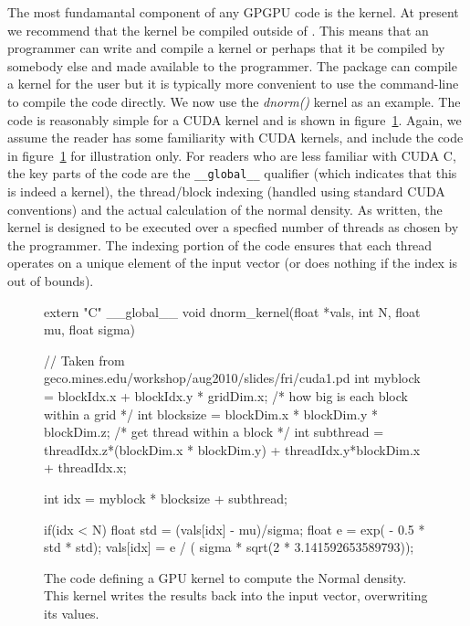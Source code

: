 \documentclass[article]{jss}
\def\C{\proglang{C}}
\def\R{\proglang{R}}
\def\Rpkg#1{\pkg{#1}}
\def\Cfunc#1{\textit{#1()}}
\begin{document}
The most fundamantal component of any GPGPU code is the kernel. 
At present we recommend that the kernel be compiled outside of \R.  This
means that an \R{} programmer can write and compile a kernel or
perhaps that it be compiled by somebody else and made available to the
\R{} programmer.  The \Rpkg{RCUDA} package can compile a kernel for
the \R{} user but it is typically more convenient to use the command-line
to compile the code directly. We now use the \Cfunc{dnorm} kernel as an example.
The code is reasonably simple for a CUDA kernel and is shown in
figure~\ref{fig:dnormKernelCode}. Again, we assume the reader has some
familiarity with CUDA kernels, and include the code in figure~\ref{fig:dnormKernelCode}
for illustration only. For readers who are less familiar with CUDA C, 
the key parts of the code are the \texttt{\_\_global\_\_} 
qualifier (which indicates that this is indeed a kernel), the 
thread/block indexing (handled using standard CUDA conventions) and the
actual calculation of the normal density. As written, the kernel is designed 
to be executed over a specfied number of threads as chosen by the 
programmer. The indexing portion of the code ensures that each 
thread operates on a unique element of the input vector (or does nothing
if the index is out of bounds). 
\begin{figure}
\begin{CCode}
extern "C"
__global__ void dnorm_kernel(float *vals, int N, float mu, float sigma)
{
       // Taken from geco.mines.edu/workshop/aug2010/slides/fri/cuda1.pd
    int myblock = blockIdx.x + blockIdx.y * gridDim.x;
           /* how big is each block within a grid */
    int blocksize = blockDim.x * blockDim.y * blockDim.z;
            /* get thread within a block */
    int subthread = threadIdx.z*(blockDim.x * blockDim.y) + 
                         threadIdx.y*blockDim.x + threadIdx.x;

    int idx = myblock * blocksize + subthread;

	if(idx < N) {
            float std = (vals[idx] - mu)/sigma;
	    float e = exp( - 0.5 * std * std);
	    vals[idx] = e / ( sigma * sqrt(2 * 3.141592653589793));
	}
}
\end{CCode}
\caption{The \C{} code defining a GPU kernel to compute the Normal
  density.  This kernel writes the results back into the input
  vector, overwriting its values.
}\label{fig:dnormKernelCode}
\end{figure}
\end{document}
